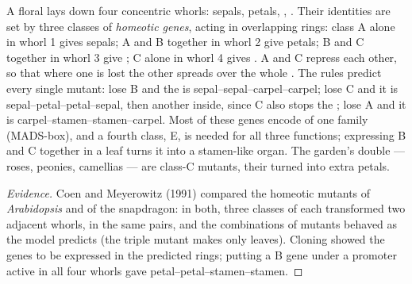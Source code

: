\begin{proposition}\label{prop:b2:plant-flowering:abc}
A floral  lays down four concentric whorls: sepals, petals,
, . Their identities are set by three classes of
\emph{homeotic genes}, acting in overlapping rings: class A alone
in whorl 1 gives sepals; A and B together in whorl 2 give petals;
B and C together in whorl 3 give ; C alone in whorl 4 gives
. A and C repress each other, so that where one is lost the
other spreads over the whole . The rules predict every single
mutant: lose B and the  is sepal--sepal--carpel--carpel;
lose C and it is sepal--petal--petal--sepal, then another 
inside, since C also stops the ; lose A and it is
carpel--stamen--stamen--carpel. Most of these genes encode
 of one family (MADS-box), and a fourth
class, E, is needed for all three functions; expressing B and C
together in a leaf turns it into a stamen-like organ. The garden's
double  --- roses, peonies, camellias --- are class-C
mutants, their  turned into extra petals.
\end{proposition}
\begin{proof}[Evidence]
Coen and Meyerowitz (1991) compared the homeotic mutants of
\emph{Arabidopsis} and of the snapdragon: in both, three classes of
 each transformed two adjacent whorls, in the same pairs,
and the combinations of mutants behaved as the model predicts (the
triple mutant makes only leaves). Cloning showed the genes to be
 expressed in the predicted rings; putting a
B gene under a promoter active in all four whorls gave
petal--petal--stamen--stamen.
\end{proof}

